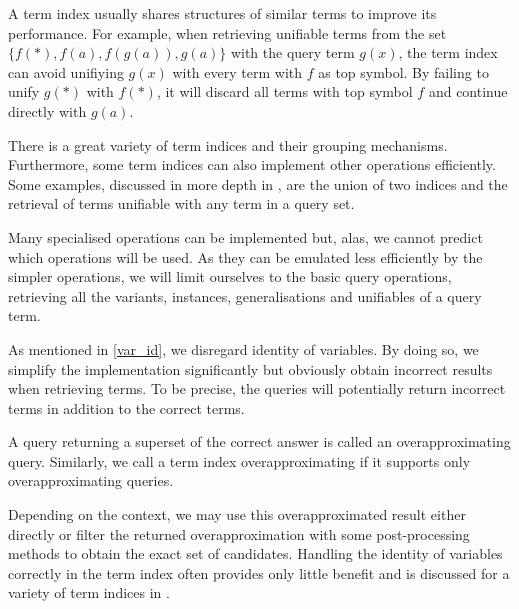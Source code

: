 
A term index usually shares structures of similar terms to improve its performance. For example, when retrieving unifiable terms from the set $\{f(*), f(a), f(g(a)), g(a)\}$ with the query term $g(x)$, the term index can avoid unifiying $g(x)$ with every term with $f$ as top symbol. By failing to unify $g(*)$ with $f(*)$, it will discard all terms with top symbol $f$ and continue directly with $g(a)$.

There is a great variety of term indices and their grouping mechanisms. Furthermore, some term indices can also implement other operations efficiently. Some examples, discussed in more depth in \cite{carbonell_comparison_1995}, are the union of two indices and the retrieval of terms unifiable with any term in a query set.

Many specialised operations can be implemented but, alas, we cannot predict which operations will be used. As they can be emulated less efficiently by the simpler operations, we will limit ourselves to the basic query operations, retrieving all the variants, instances, generalisations and unifiables of a query term.

As mentioned in \cref{var_id}, we disregard identity of variables. By doing so, we simplify the implementation significantly but obviously obtain incorrect results when retrieving terms. To be precise, the queries will potentially return incorrect terms in addition to the correct terms.

\begin{defn}
  A query returning a superset of the correct answer is called an overapproximating query. Similarly, we call a term index overapproximating if it supports only overapproximating queries.
\end{defn}

Depending on the context, we may use this overapproximated result either directly or filter the returned overapproximation with some post-processing methods to obtain the exact set of candidates. Handling the identity of variables correctly in the term index often provides only little benefit and is discussed for a variety of term indices in \cite{carbonell_comparison_1995}.
